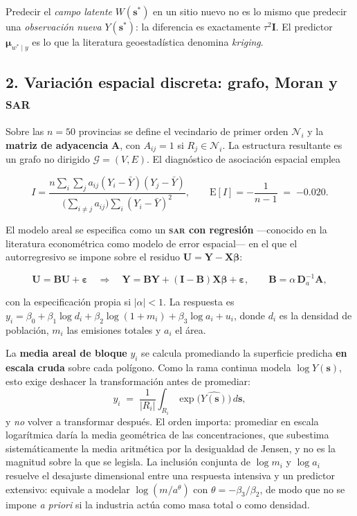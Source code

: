 \documentclass[11pt,a4paper]{article}
\newcommand{\loc}{\bm{s}}
\newcommand{\Wp}[1]{W(#1)}
\newcommand{\Yp}[1]{Y(#1)}
\newcommand{\pepita}{\tau^{2}}
\newcommand{\Adj}{\bm{A}}
\newcommand{\Esp}{\mathrm{E}}
\begin{document}
Predecir el \emph{campo latente} $\Wp{\loc^{*}}$ en un sitio nuevo no es lo
mismo que predecir una \emph{observación nueva} $\Yp{\loc^{*}}$: la diferencia
es exactamente $\pepita\bm{I}$. El predictor $\bm{\mu}_{w^*\mid y}$ es lo que
la literatura geoestadística denomina \emph{kriging}.

\subsection*{2. Variación espacial discreta: grafo, Moran y \textsc{sar}}

Sobre las $n=\num{50}$ provincias se define el vecindario de primer orden
$\mathcal{N}_i$ y la \textbf{matriz de adyacencia} $\Adj$, con $A_{ij}=1$ si
$R_j\in\mathcal{N}_i$. La estructura resultante es un grafo no dirigido
$\mathcal{G}=(V,E)$. El diagnóstico de asociación espacial emplea

\begin{equation}
I=\frac{n\sum_i\sum_j a_{ij}(Y_i-\bar{Y})(Y_j-\bar{Y})}
       {\big(\sum_{i\neq j}a_{ij}\big)\sum_i (Y_i-\bar{Y})^2},
\qquad
\Esp[I] = -\frac{1}{n-1} \;=\; \num{-0.020}.
\end{equation}

El modelo areal se especifica como un \textbf{\textsc{sar} con regresión}
—conocido en la literatura econométrica como modelo de error espacial— en el
que el autorregresivo se impone sobre el residuo
$\bm{U}=\bm{Y}-\bm{X}\bm{\beta}$:

\begin{equation}
\bm{U}=\bm{B}\bm{U}+\bm{\varepsilon}
\quad\Longrightarrow\quad
\bm{Y} = \bm{B}\bm{Y} + (\bm{I}-\bm{B})\bm{X}\bm{\beta} + \bm{\varepsilon},
\qquad \bm{B}=\alpha\,\bm{D}_a^{-1}\Adj,
\end{equation}

con la especificación propia si $|\alpha|<1$. La respuesta es
$y_i = \beta_0 + \beta_1\log d_i + \beta_2\log(1+m_i) + \beta_3\log a_i + u_i$,
donde $d_i$ es la densidad de población, $m_i$ las emisiones totales y $a_i$ el
área.

La \textbf{media areal de bloque} $y_i$ se calcula promediando la superficie
predicha \textbf{en escala cruda} sobre cada polígono. Como la rama continua
modela $\log \Yp{\loc}$, esto exige deshacer la transformación antes de
promediar:
\[
y_i \;=\; \frac{1}{|R_i|}\int_{R_i} \exp\!\big(\hat{\Yp{\loc}}\big)\,d\loc ,
\]
y \emph{no} volver a transformar después. El orden importa: promediar en escala
logarítmica daría la media geométrica de las concentraciones, que subestima
sistemáticamente la media aritmética por la desigualdad de Jensen, y no es la
magnitud sobre la que se legisla. La inclusión conjunta de $\log m_i$ y $\log a_i$ resuelve el desajuste
dimensional entre una respuesta intensiva y un predictor extensivo: equivale a
modelar $\log(m/a^{\theta})$ con $\theta=-\beta_3/\beta_2$, de modo que no se
impone \emph{a priori} si la industria actúa como masa total o como densidad.
\end{document}
